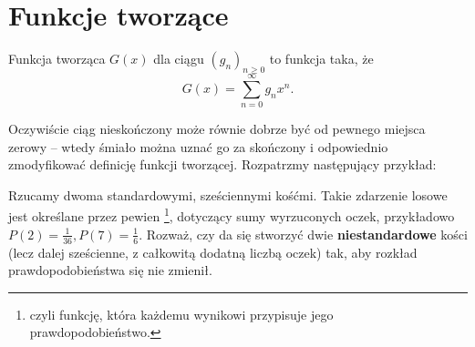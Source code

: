\documentclass{scrartcl}
\begin{document}
\section{Funkcje tworzące}
    \begin{definition}
        Funkcja tworząca $G(x)$ dla ciągu $(g_n)_{n\geq 0}$ to funkcja taka, że
        $$ G(x) = \sum_{n = 0}^\infty g_nx^n. $$
    \end{definition}

    Oczywiście ciąg nieskończony może równie dobrze być od pewnego miejsca zerowy -- wtedy śmiało można uznać go za skończony i odpowiednio zmodyfikować definicję funkcji tworzącej. Rozpatrzmy następujący przykład:
    \begin{example}
        Rzucamy dwoma standardowymi, sześciennymi kośćmi. Takie zdarzenie losowe jest określane przez pewien \footnote{czyli funkcję, która każdemu wynikowi przypisuje jego prawdopodobieństwo.}, dotyczący sumy wyrzuconych oczek, przykładowo $P(2) = \frac{1}{36}, P(7) = \frac{1}{6}$. Rozważ, czy da się stworzyć dwie \textbf{niestandardowe} kości (lecz dalej sześcienne, z całkowitą dodatną liczbą oczek) tak, aby rozkład prawdopodobieństwa się nie zmienił.
    \end{example}
\end{document}
